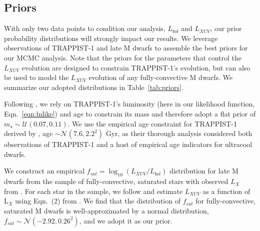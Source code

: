 \documentclass[twocolumn]{aastex62}
\begin{document}
\subsection{Priors} \label{sec:mcmc:priors}

With only two data points to condition our analysis, $L_{bol}$ and $L_{XUV}$, our prior probability distributions will strongly impact our results. We leverage observations of TRAPPIST-1 and late M dwarfs to assemble the best priors for our MCMC analysis. Note that the priors for the parameters that control the $L_{XUV}$ evolution are designed to constrain TRAPPIST-1's evolution, but can also be used to model the $L_{XUV}$ evolution of any fully-convective M dwarfs. We summarize our adopted distributions in Table~\ref{tab:priors}.

Following \citet{vanGrootel2018}, we rely on TRAPPIST-1's luminosity (here in our likelihood function, Eqn.~\ref{eqn:lnlike}) and age to constrain its mass and therefore adopt a flat prior of $m_{\star} \sim \mathcal{U}(0.07, 0.11)$. We use the empirical age constraint for TRAPPIST-1 derived by \citet{Burgasser2017}, age $\sim \mathcal{N}(7.6, 2.2^2)$ Gyr, as their thorough analysis considered both observations of TRAPPIST-1 and a host of empirical age indicators for ultracool dwarfs. 

We construct an empirical $f_{sat} = \log_{10}(L_{XUV}/L_{bol})$ distribution for late M dwarfs from the sample of fully-convective, saturated stars with observed $L_{X}$ from \citet{Wright2011}. For each star in the \citet{Wright2011} sample, we follow \citet{Wheatley2017} and estimate $L_{XUV}$ as a function of L$_{X}$ using Eqn.~(2) from \citet{Chadney2015}. We find that the distribution of $f_{sat}$ for fully-convective, saturated M dwarfs is well-approximated by a normal distribution, $f_{sat} \sim \mathcal{N}(-2.92, 0.26^2)$, and we adopt it as our prior. 
\end{document}
